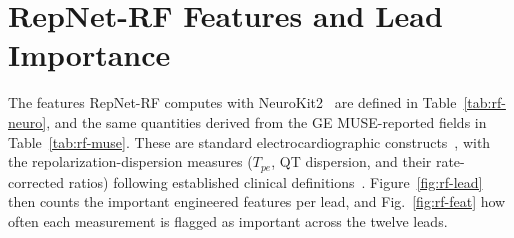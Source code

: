 \documentclass[sigconf,nonacm]{acmart}
\begin{document}
\clearpage
\section{RepNet-RF Features and Lead Importance}
\label{appendix:features}
\label{appendix:rf-imp}
\setlength{\intextsep}{3pt}
\setlength{\floatsep}{3pt}
\setlength{\textfloatsep}{3pt}

The features RepNet-RF computes with NeuroKit2~\cite{makowski_neurokit2_2021} are defined in
Table~\ref{tab:rf-neuro}, and the same quantities derived from the
GE MUSE-reported fields in Table~\ref{tab:rf-muse}. These are standard
electrocardiographic constructs~\cite{surawicz_chous_2008}, with the
repolarization-dispersion measures ($T_{pe}$, QT dispersion, and their
rate-corrected ratios) following established clinical definitions~\cite{aboshady_qtc_2025, raffaelli_pre-eclampsia_2014}. Figure~\ref{fig:rf-lead}
then counts the important engineered features per lead, and
Fig.~\ref{fig:rf-feat} how often each measurement is flagged as important
across the twelve leads.
\end{document}
